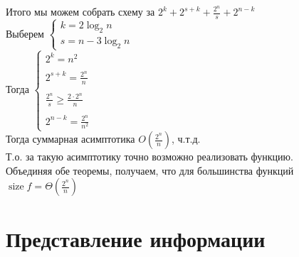 \documentclass[12pt]{article}
\begin{document}
Итого мы можем собрать схему за $2^k+2^{s+k}+\frac{2^n}s+2^{n-k}$\\
Выберем $\left\{\begin{array}{l}
    k = 2\log_2 n  \\
    s = n - 3\log_2 n
\end{array}\right.$\\
Тогда $\left\{\begin{array}{l}
     2^k=n^2  \\\\
     2^{s+k} = \frac{2^n}{n}\\\\
     \frac{2^n}s\geq \frac{2\cdot 2^n}{n}\\\\
     2^{n-k} = \frac{2^n}{n^2}
\end{array}\right.$\\
Тогда суммарная асимптотика $O(\frac {2^n}n)$, ч.т.д.\\
Т.о. за такую асимптотику точно возможно реализовать функцию.\\
Объединяя обе теоремы, получаем, что для большинства функций $\operatorname{size} f = \Theta(\frac{2^n}n)$
\section{Представление информации}
\end{document}
